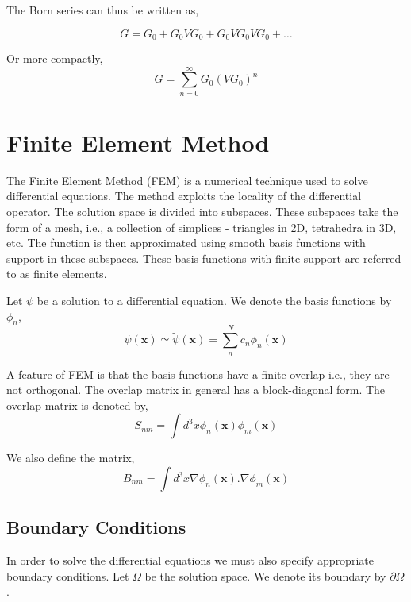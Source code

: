 \documentclass[a4paper,10pt]{report}
\begin{document}
The Born series can thus be written as,

\begin{equation}\label{BornSeriesExpanded}
 G=G_0+G_0VG_0+G_0VG_0VG_0+\ldots
\end{equation}

\noindent Or more compactly,
\begin{equation}\label{BornSeriesCompact}
 G=\displaystyle\sum_{n=0}^{\infty}G_0\left(VG_0\right)^n
\end{equation}

\section{Finite Element Method}
The Finite Element Method (FEM) is a numerical technique used to solve differential equations.
The method exploits the locality of the differential operator. The solution space is divided into
subspaces. These subspaces take the form of a mesh, i.e., a collection of simplices - triangles
in 2D, tetrahedra in 3D, etc. The function is then approximated using smooth basis functions with support in these subspaces.
These basis functions with finite support are referred to as finite elements.

Let $\psi$ be a solution to a differential equation. We denote the basis functions by $\phi_n$,
\begin{equation}\label{femfirst}
 \psi(\mathbf{x})\simeq\widetilde{\psi}(\mathbf{x})=\displaystyle\sum_n^N c_n\phi_n(\mathbf{x})
\end{equation}

A feature of FEM is that the basis functions have a finite overlap i.e., they are not orthogonal.
The overlap matrix in general has a block-diagonal form. The overlap matrix is denoted by,
\begin{equation}\label{overlap}
 S_{nm}=\int d^3x\phi_n(\mathbf{x})\phi_m(\mathbf{x})
\end{equation}

We also define the matrix,
\begin{equation}\label{diff_overlap}
 B_{nm}=\int d^3x\nabla\phi_n(\mathbf{x}).\nabla\phi_m(\mathbf{x})
\end{equation}

\subsection{Boundary Conditions}
In order to solve the differential equations we must also specify appropriate boundary
conditions. Let $\Omega$ be the solution space. We denote its boundary by $\partial\Omega$.
\end{document}
